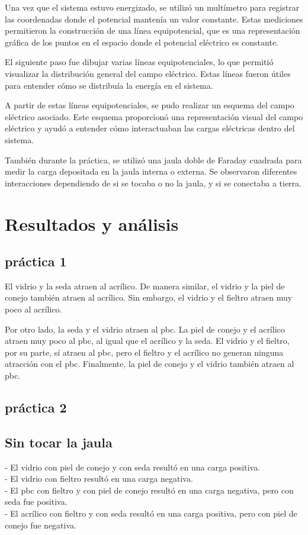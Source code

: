 \documentclass{article}
\begin{document}
\begin{multicols}{2}
Una vez que el sistema estuvo energizado, se utilizó un multímetro para registrar las coordenadas donde el potencial mantenía un valor constante. Estas mediciones permitieron la construcción de una línea equipotencial, que es una representación gráfica de los puntos en el espacio donde el potencial eléctrico es constante.

El siguiente paso fue dibujar varias líneas equipotenciales, lo que permitió visualizar la distribución general del campo eléctrico. Estas líneas fueron útiles para entender cómo se distribuía la energía en el sistema.

A partir de estas líneas equipotenciales, se pudo realizar un esquema del campo eléctrico asociado. Este esquema proporcionó una representación visual del campo eléctrico y ayudó a entender cómo interactuaban las cargas eléctricas dentro del sistema.

También durante la práctica, se utilizó una jaula doble de Faraday cuadrada para medir la carga depositada en la jaula interna o externa. Se observaron diferentes interacciones dependiendo de si se tocaba o no la jaula, y si se conectaba a tierra.


\end{multicols}
\section{Resultados y análisis}\label{Resultados}			%
\subsection{práctica 1}\label{p1}
El vidrio y la seda atraen al acrílico. De manera similar, el vidrio y la piel de conejo también atraen al acrílico. Sin embargo, el vidrio y el fieltro atraen muy poco al acrílico.

Por otro lado, la seda y el vidrio atraen al pbc. La piel de conejo y el acrílico atraen muy poco al pbc, al igual que el acrílico y la seda. El vidrio y el fieltro, por su parte, sí atraen al pbc, pero el fieltro y el acrílico no generan ninguna atracción con el pbc. Finalmente, la piel de conejo y el vidrio también atraen al pbc.
\subsection{práctica 2}\label{p2}
\subsection*{Sin tocar la jaula}
- El vidrio con piel de conejo y con seda resultó en una carga positiva.\\
- El vidrio con fieltro resultó en una carga negativa.\\
- El pbc con fieltro y con piel de conejo resultó en una carga negativa, pero con seda fue positiva.\\
- El acrílico con fieltro y con seda resultó en una carga positiva, pero con piel de conejo fue negativa.
\end{document}
